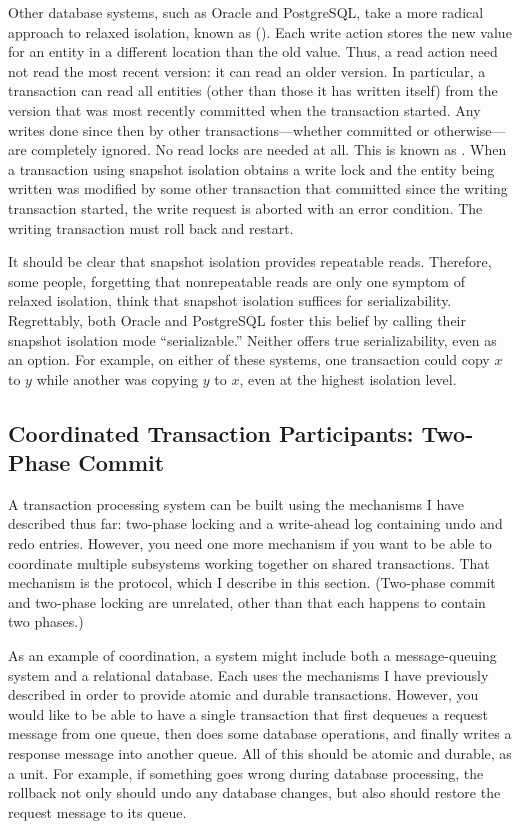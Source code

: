 Other database systems, such as Oracle and PostgreSQL, take a more
radical approach to relaxed isolation, known as  ().  Each write action stores the
new value for an entity in a different location than the old value.
Thus, a read action need not read the most recent version: it can read
an older version.  In particular, a transaction can read all entities
(other than those it has written itself) from the version that was
most recently committed when the transaction started.  Any writes
done since then by other transactions---whether committed or
otherwise---are completely ignored.  No read locks are needed at all.  This
is known as .
When a transaction using snapshot isolation obtains a write lock and the entity being written was modified by some other transaction that committed since the writing transaction started, the write request is aborted with an error condition. The writing transaction must roll back and restart.

It should be clear that snapshot isolation provides repeatable reads.
Therefore, some people, forgetting that nonrepeatable reads are only
one symptom of relaxed isolation, think that snapshot isolation
suffices for serializability.  Regrettably, both Oracle and PostgreSQL
foster this belief by calling their snapshot isolation mode
``serializable.''  Neither offers true serializability, even as an option.
For example, on either of these systems, one transaction could copy
$x$ to $y$ while another was copying $y$ to $x$, even at the highest
isolation level.

\subsection{Coordinated Transaction Participants: Two-Phase Commit}
\label{two-phase-commit-section}
A transaction processing system can be built using the mechanisms I
have described thus far: two-phase locking and a write-ahead log
containing undo and redo entries.  However, you need one more mechanism
if you want to be able to coordinate multiple subsystems working
together on shared transactions.  That mechanism is the
 protocol, which I describe in this section.
(Two-phase commit and two-phase locking
are unrelated, other than that each happens to contain two phases.)

As an example of coordination, a system might include both a
message-queuing system and a relational database.  Each uses the
mechanisms I have previously described in order to provide atomic and
durable transactions.  However, you would like to be able to have a
single transaction that first dequeues a request message from one
queue, then does some database operations, and finally writes a
response message into another queue.  All of this should be atomic and
durable, as a unit.  For example, if something goes wrong during
database processing, the rollback not only should undo any database
changes, but also should restore the request message to its queue.

